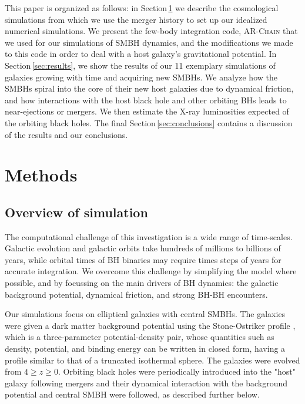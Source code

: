 \documentclass[fleqn,usenatbib,useAMS]{mnras}
\begin{document}
This paper is organized as follows: in Section\,\ref{sec:methods} we describe the cosmological simulations from which we use the merger history to set up our idealized numerical simulations. We present the few-body integration code, \textsc{AR-Chain} that we used for our simulations of SMBH dynamics, and the modifications we made to this code in order to deal with a host galaxy's gravitational potential. In Section\,\ref{sec:results}, we show the results of our 11 exemplary simulations of galaxies growing with time and acquiring new SMBHs. We analyze how the SMBHs spiral into the core of their new host galaxies due to dynamical friction, and how interactions with the host black hole and other orbiting BHs leads to near-ejections or mergers. We then estimate the X-ray luminosities expected of the orbiting black holes.  The final Section\,\ref{sec:conclusions} contains a discussion of the results and our conclusions.

\section{Methods}\label{sec:methods}

\subsection{Overview of simulation}
The computational challenge of this investigation is a wide range of time-scales. Galactic evolution and galactic orbits take hundreds of millions to billions of years, while orbital times of BH binaries may require times steps of years for accurate integration. We overcome this challenge by simplifying the model where possible, and by focussing on the main drivers of BH dynamics: the galactic background potential, dynamical friction, and strong BH-BH encounters.

Our simulations focus on elliptical galaxies with central SMBHs. The galaxies were given a dark matter background potential using the Stone-Ostriker profile \citep{2015ApJ...806L..28S}, which is a three-parameter potential-density pair, whose quantities such as density, potential, and binding energy can be written in closed form, having a profile similar to that of a truncated isothermal sphere.  The galaxies were evolved from $4\geq z \geq 0$.  Orbiting black holes were periodically introduced into the "host" galaxy following mergers and their dynamical interaction with the background potential and central SMBH were followed, as described further below.
\end{document}

